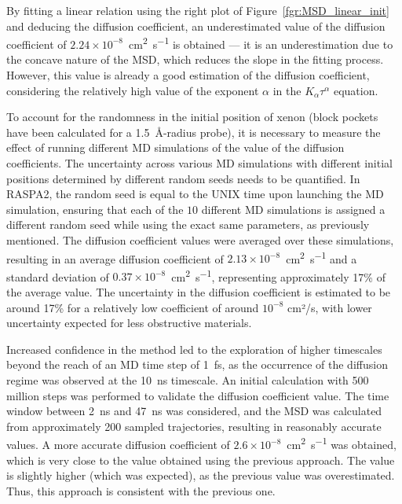 \documentclass[main]{subfiles}
\begin{document}
By fitting a linear relation using the right plot of Figure~\ref{fgr:MSD_linear_init} and deducing the diffusion coefficient, an underestimated value of the diffusion coefficient of $2.24\times 10^{-8}$~\si{\square\cm\per\s} is obtained --- it is an underestimation due to the concave nature of the MSD, which reduces the slope in the fitting process. However, this value is already a good estimation of the diffusion coefficient, considering the relatively high value of the exponent $\alpha$ in the $K_\alpha\tau^\alpha$ equation.

To account for the randomness in the initial position of xenon (block pockets have been calculated for a \SI{1.5}{\angstrom}-radius probe), it is necessary to measure the effect of running different MD simulations of the value of the diffusion coefficients. The uncertainty across various MD simulations with different initial positions determined by different random seeds needs to be quantified. In RASPA2, the random seed is equal to the UNIX time upon launching the MD simulation, ensuring that each of the $10$ different MD simulations is assigned a different random seed while using the exact same parameters, as previously mentioned. The diffusion coefficient values were averaged over these simulations, resulting in an average diffusion coefficient of $2.13\times 10^{-8}$~\si{\square\cm\per\s} and a standard deviation of $0.37\times 10^{-8}$~\si{\square\cm\per\s}, representing approximately {17\%} of the average value. The uncertainty in the diffusion coefficient is estimated to be around {17\%} for a relatively low coefficient of around $10^{-8}$ cm²/s, with lower uncertainty expected for less obstructive materials.

Increased confidence in the method led to the exploration of higher timescales beyond the reach of an MD time step of \SI{1}{\fs}, as the occurrence of the diffusion regime was observed at the \SI{10}{\ns} timescale. An initial calculation with 500 million steps was performed to validate the diffusion coefficient value. The time window between \SI{2}{\ns} and \SI{47}{\ns} was considered, and the MSD was calculated from approximately 200 sampled trajectories, resulting in reasonably accurate values. A more accurate diffusion coefficient of $2.6\times 10^{-8}$~\si{\square\cm\per\s} was obtained, which is very close to the value obtained using the previous approach. The value is slightly higher (which was expected), as the previous value was overestimated. Thus, this approach is consistent with the previous one.
\end{document}
